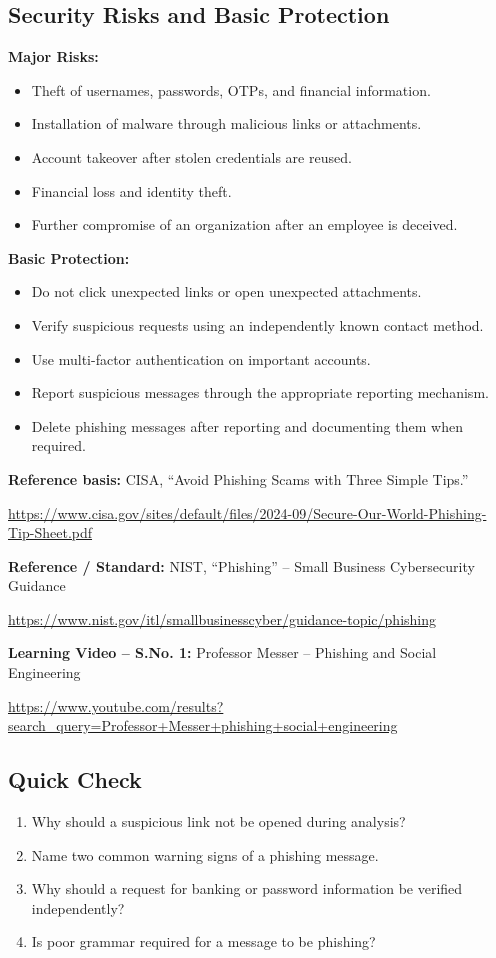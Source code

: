 \documentclass[12pt,a4paper]{article}
\newcommand{\referenceblock}[2]{%
\begin{samepage}
\noindent\textbf{Reference basis:} #1\par
\smallskip
\noindent\url{#2}\par
\end{samepage}
\par\vspace{0.25cm}
}
\newcommand{\paperblock}[2]{%
\begin{samepage}
\noindent\textbf{Reference / Standard:} #1\par
\smallskip
\noindent\url{#2}\par
\end{samepage}
\par\vspace{0.25cm}
}
\newcommand{\videoblock}[3]{%
\begin{samepage}
\noindent\textbf{Learning Video -- S.No. #1:} #2\par
\smallskip
\noindent\url{#3}\par
\end{samepage}
\par\vspace{0.25cm}
}
\begin{document}
\subsection{Security Risks and Basic Protection}

\textbf{Major Risks:}
\begin{itemize}
    \item Theft of usernames, passwords, OTPs, and financial information.
    \item Installation of malware through malicious links or attachments.
    \item Account takeover after stolen credentials are reused.
    \item Financial loss and identity theft.
    \item Further compromise of an organization after an employee is deceived.
\end{itemize}

\textbf{Basic Protection:}
\begin{itemize}
    \item Do not click unexpected links or open unexpected attachments.
    \item Verify suspicious requests using an independently known contact method.
    \item Use multi-factor authentication on important accounts.
    \item Report suspicious messages through the appropriate reporting mechanism.
    \item Delete phishing messages after reporting and documenting them when required.
\end{itemize}

\referenceblock{CISA, ``Avoid Phishing Scams with Three Simple Tips.''}{https://www.cisa.gov/sites/default/files/2024-09/Secure-Our-World-Phishing-Tip-Sheet.pdf}

\paperblock{NIST, ``Phishing'' -- Small Business Cybersecurity Guidance}{https://www.nist.gov/itl/smallbusinesscyber/guidance-topic/phishing}

\videoblock{1}{Professor Messer -- Phishing and Social Engineering}{https://www.youtube.com/results?search_query=Professor+Messer+phishing+social+engineering}

\subsection{Quick Check}

\begin{enumerate}
    \item Why should a suspicious link not be opened during analysis?
    \item Name two common warning signs of a phishing message.
    \item Why should a request for banking or password information be verified independently?
    \item Is poor grammar required for a message to be phishing?
\end{enumerate}
\end{document}
